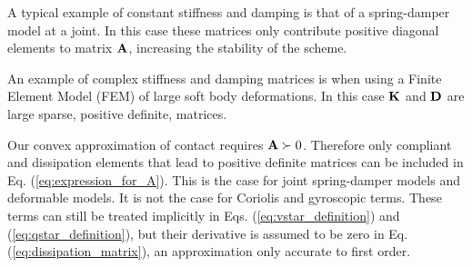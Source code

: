 A typical example of constant stiffness and damping is that of a spring-damper
model at a joint. In this case these matrices only contribute positive diagonal
elements to matrix ${\mathbf{A}}$, increasing the stability of the scheme.

An example of complex stiffness and damping matrices is when using a Finite
Element Model (FEM) of large soft body deformations. In this case ${\mathbf{K}}$ and
${\mathbf{D}}$ are large sparse, positive definite, matrices.

Our convex approximation of contact requires ${\mathbf{A}}\succ 0$. Therefore only
compliant and dissipation elements that lead to positive definite matrices can
be included in Eq. (\ref{eq:expression_for_A}). This is the case for joint
spring-damper models and deformable models. It is not the case for Coriolis and
gyroscopic terms. 
These terms can still be treated implicitly in Eqs.
(\ref{eq:vstar_definition}) and (\ref{eq:qstar_definition}), but their
derivative is assumed to be zero in Eq. (\ref{eq:dissipation_matrix}), an
approximation only accurate to first order.

